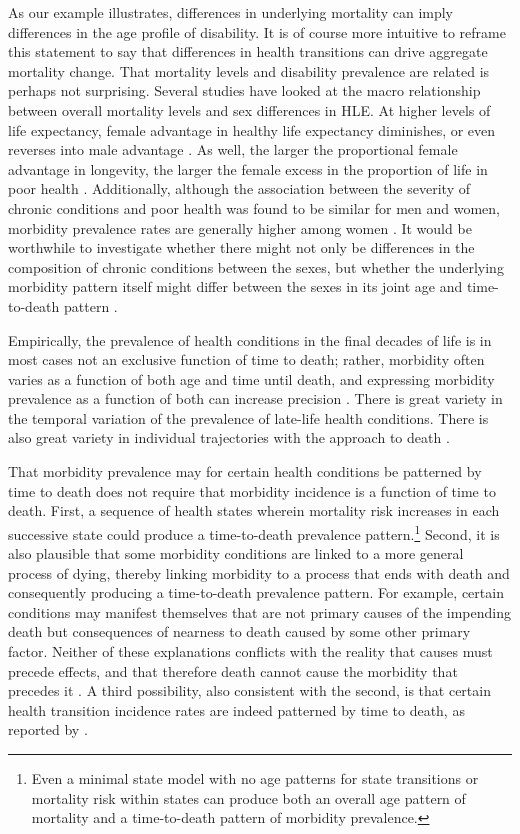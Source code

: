 \documentclass[12pt,oneside,letterpaper,doublespacing]{article}  %
\begin{document}
As our example illustrates, differences
in underlying mortality can imply differences in the age profile of
disability. It is of course more intuitive to reframe this statement to say that differences in health transitions can drive aggregate mortality change. That mortality levels and disability prevalence
are related is perhaps not surprising. Several studies have looked at the macro relationship between overall mortality
levels and sex differences in HLE. At higher levels of life expectancy, female
advantage in healthy life expectancy diminishes, or even reverses into male
advantage \citep{vanOyen2013}. As well, the larger the proportional female
advantage in longevity, the larger the female excess in the proportion of life
in poor health \citep{Luy2014}. 
Additionally, although the association between the severity of chronic conditions and poor health was found
to be similar for men and women, morbidity prevalence rates are generally higher
among women \citep{Case2005}. It
would be worthwhile to investigate whether there might not only be differences
in the composition of chronic conditions between the sexes, but whether the
underlying morbidity pattern itself might differ between the sexes in its joint
age and time-to-death pattern \citep{riffe2017ttd}.

Empirically, the prevalence of health conditions in the final decades of life is in most cases not an exclusive function of time to death; rather, morbidity often varies as a function of
both age and time until death, and expressing morbidity prevalence
as a function of both can increase precision
\citep{klijs2011future, riffe2017ttd}.
There is great variety in the temporal variation of the prevalence of late-life
health conditions. There is also great variety in individual trajectories with
the approach to death \citep{lunney2003patterns}. 

That morbidity prevalence may for certain health conditions be patterned by
time to death does not require that morbidity incidence is a function
of time to death. First, a sequence of health states wherein
mortality risk increases in each successive state could produce a time-to-death
prevalence pattern.\footnote{Even a minimal state model with no age patterns for state transitions or mortality risk within states can produce both an overall age pattern of mortality and a time-to-death pattern of morbidity prevalence.} Second, it is also
plausible that some morbidity conditions are linked to a more general process of dying, thereby
linking morbidity to a process that ends with death and consequently producing a
time-to-death prevalence pattern. For example, certain conditions may manifest
themselves that are not primary causes of the impending death but
consequences of nearness to death caused by some other primary factor.
Neither of these explanations conflicts with the reality that causes must
precede effects, and that therefore death cannot cause the morbidity that precedes it \citep{lynch2015commentary}. A third possibility, also consistent with the second, is that certain health transition incidence rates are indeed patterned by time to death, as reported by \citet{klijs2010disability}.
\end{document}
